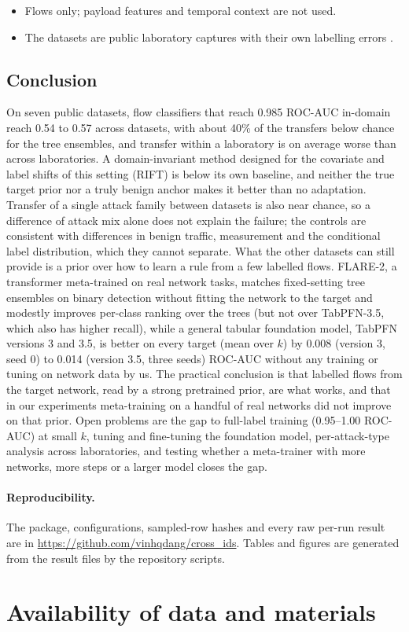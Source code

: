 \documentclass[11pt]{article}
\begin{document}
\begin{itemize}
\item Flows only; payload features and temporal context are not used.
\item The datasets are public laboratory captures with their own labelling errors \citep{engelen2021troubleshooting}.
\end{itemize}

\subsection{Conclusion}
On seven public datasets, flow classifiers that reach 0.985 ROC-AUC in-domain reach 0.54 to 0.57 across datasets, with about 40\% of the transfers below chance for the tree ensembles, and transfer within a laboratory is on average worse than across laboratories.
A domain-invariant method designed for the covariate and label shifts of this setting (RIFT) is below its own baseline, and neither the true target prior nor a truly benign anchor makes it better than no adaptation.
Transfer of a single attack family between datasets is also near chance, so a difference of attack mix alone does not explain the failure; the controls are consistent with differences in benign traffic, measurement and the conditional label distribution, which they cannot separate.
What the other datasets can still provide is a prior over how to learn a rule from a few labelled flows.
FLARE-2, a transformer meta-trained on real network tasks, matches fixed-setting tree ensembles on binary detection without fitting the network to the target and modestly improves per-class ranking over the trees (but not over TabPFN-3.5, which also has higher recall), while a general tabular foundation model, TabPFN versions 3 and 3.5, is better on every target (mean over $k$) by 0.008 (version 3, seed 0) to 0.014 (version 3.5, three seeds) ROC-AUC without any training or tuning on network data by us.
The practical conclusion is that labelled flows from the target network, read by a strong pretrained prior, are what works, and that in our experiments meta-training on a handful of real networks did not improve on that prior.
Open problems are the gap to full-label training (0.95--1.00 ROC-AUC) at small $k$, tuning and fine-tuning the foundation model, per-attack-type analysis across laboratories, and testing whether a meta-trainer with more networks, more steps or a larger model closes the gap.

\paragraph{Reproducibility.}
The package, configurations, sampled-row hashes and every raw per-run result are in \url{https://github.com/vinhqdang/cross_ids}. Tables and figures are generated from the result files by the repository scripts.

\section*{Availability of data and materials}




\end{document}
